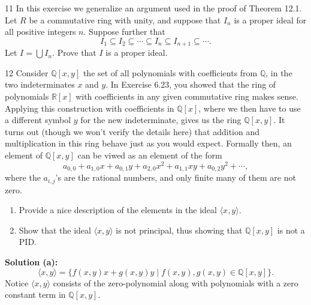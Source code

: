 \begin{problem}{11}
    In this exercise we generalize an argument used in the proof of Theorem 12.1. Let
    $R$ be a commutative ring with unity, and suppose that $I_n$ is a proper ideal for
    all positive integers $n$. Suppose further that
    \[I_1 \subseteq I_2 \subseteq \cdots \subseteq I_n \subseteq I_{n + 1} \subseteq \cdots.\]
    Let $I = \bigcup I_n$. Prove that $I$ is a proper ideal.
\end{problem}
\unsolved

\begin{problem}{12}
    Consider $\mathbb{Q}[x, y]$ the set of all polynomials with coefficients from
    $\mathbb{Q}$, in the two indeterminates $x$ and $y$.
    In Exercise 6.23, you showed that the ring of polynomials $\mathbb{R}[x]$ with coefficients 
    in any given commutative ring makes sense.
    Applying this construction with coefficients in $\mathbb{Q}[x]$, where we then have to use 
    a different symbol $y$ for the new indeterminate, gives us
    the ring $\mathbb{Q}[x, y]$. It turns out (though we won't verify the details here)
    that addition and multiplication in this ring behave just as you would expect.
    Formally then, an element of $\mathbb{Q}[x, y]$ can be viwed as an element of the form 
    \[a_{0, 0} + a_{1, 0} x + a_{0, 1} y + a_{2, 0} x^2 + a_{1, 1} x y + a_{0, 2} y^2 + \cdots,\]
    where the $a_{i, j}$'s are the rational numbers, and only finite many of them are not zero.
    \begin{enumerate}
        \item Provide a nice description of the elements in the ideal $\langle x, y \rangle$.
        \item Show that the ideal $\langle x, y \rangle$ is not principal, thus showing that $\mathbb{Q}[x, y]$ is not a PID.
    \end{enumerate}
\end{problem}
\solved

\textbf{Solution (a): }
\[\langle x, y \rangle = \{f(x, y)x + g(x, y)y \mid f(x, y), g(x, y) \in \mathbb{Q}[x, y]\}.\] 
Notice $\langle x,y \rangle$ consists of the zero-polynomial along with polynomials with a zero constant term in $\mathbb{Q}[x, y]$.


